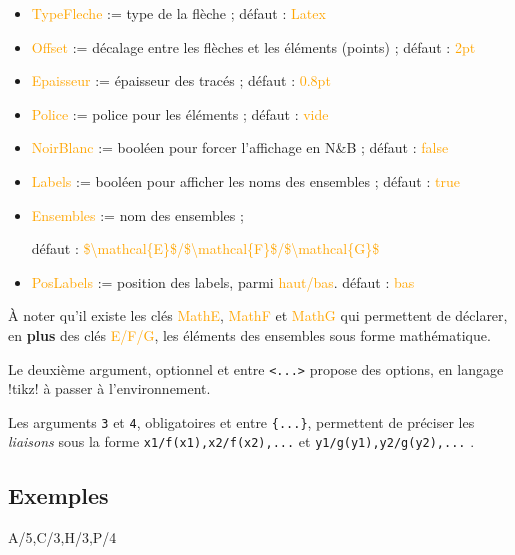 \documentclass[french,a4paper,11pt]{article}
\newcommand\Cle[1]{{\small\sffamily\textlangle \textcolor{orange}{#1}\textrangle}}
\begin{document}
{{\begin{tipblock}
\begin{itemize}
	\hfill{}défaut : \Cle{teal}
	\item \Cle{TypeFleche} := type de la flèche  ; \hfill{}défaut : \Cle{Latex}
	\item \Cle{Offset} := décalage entre les flèches et les éléments (points) ; \hfill{}défaut : \Cle{2pt}
	\item \Cle{Epaisseur} := épaisseur des tracés ; \hfill{}défaut : \Cle{0.8pt}
	\item \Cle{Police} := police pour les éléments ; \hfill{}défaut : \Cle{vide}
	\item \Cle{NoirBlanc} := booléen pour forcer l'affichage en N\&{}B ; \hfill{}défaut : \Cle{false}
	\item \Cle{Labels} := booléen pour afficher les noms des ensembles ; \hfill{}défaut : \Cle{true}
	\item \Cle{Ensembles} := nom des ensembles  ;
	
	\hfill{}défaut : \Cle{\$\textbackslash mathcal\{E\}\$/\$\textbackslash  mathcal\{F\}\$/\$\textbackslash  mathcal\{G\}\$}
	\item \Cle{PosLabels} := position des labels, parmi \Cle{haut/bas}. \hfill{}défaut : \Cle{bas}
\end{itemize}

À noter qu'il existe les clés \Cle{MathE}, \Cle{MathF} et \Cle{MathG} qui permettent de déclarer, en \textbf{plus} des clés \Cle{E/F/G}, les éléments des ensembles sous forme mathématique.

\smallskip

Le deuxième argument, optionnel et entre \texttt{<...>} propose des options, en langage \packagetex!tikz! à passer à l'environnement.

\smallskip

Les arguments \texttt{3} et \texttt{4}, obligatoires et entre \texttt{\{...\}}, permettent de préciser les \textit{liaisons} sous la forme \verb!x1/f(x1),x2/f(x2),...! et \verb!y1/g(y1),y2/g(y2),...! .
\end{tipblock}

\subsection{Exemples}

\begin{DemoCode}[]
%
	{A/5,C/3,H/3,P/4}%
\end{DemoCode}

}}
\end{document}
